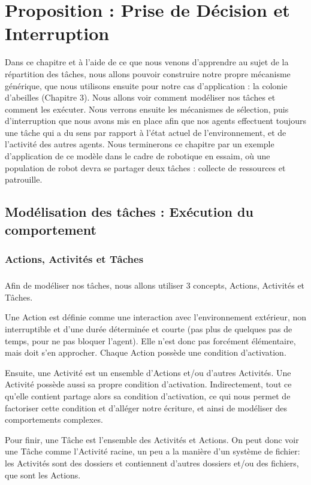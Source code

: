 \chapter{Proposition : Prise de Décision et Interruption}
	Dans ce chapitre et à l'aide de ce que nous venons d'apprendre au sujet de la répartition des tâches, nous allons pouvoir construire notre propre mécanisme générique, que nous utilisons ensuite pour notre cas d'application : la colonie d'abeilles (Chapitre 3). Nous allons voir comment modéliser nos tâches et comment les exécuter. Nous verrons ensuite les mécanismes de sélection, puis d'interruption que nous avons mis en place afin que nos agents effectuent toujours une tâche qui a du sens par rapport à l'état actuel de l'environnement, et de l'activité des autres agents. Nous terminerons ce chapitre par un exemple d'application de ce modèle dans le cadre de robotique en essaim, où une population de robot devra se partager deux tâches : collecte de ressources et patrouille.
	
	\section{Modélisation des tâches : Exécution du comportement}	
	
		\subsection{Actions, Activités et Tâches}
		\paragraph{}
			Afin de modéliser nos tâches, nous allons utiliser 3 concepts, Actions, Activités et Tâches.
			
			Une Action est définie comme une interaction avec l'environnement extérieur, non interruptible et d'une durée déterminée et courte (pas plus de quelques pas de temps, pour ne pas bloquer l'agent). Elle n'est donc pas forcément élémentaire, mais doit s'en approcher. Chaque Action possède une condition d'activation.
			
			Ensuite, une Activité est un ensemble d'Actions et/ou d'autres Activités. Une Activité possède aussi sa propre condition d'activation. Indirectement, tout ce qu'elle contient partage alors sa condition d'activation, ce qui nous permet de factoriser cette condition et d'alléger notre écriture, et ainsi de modéliser des comportements complexes.
			
			Pour finir, une Tâche est l'ensemble des Activités et Actions. On peut donc voir une Tâche comme l'Activité racine, un peu a la manière d'un système de fichier: les Activités sont des dossiers et contiennent d'autres dossiers et/ou des fichiers, que sont les Actions.
			
